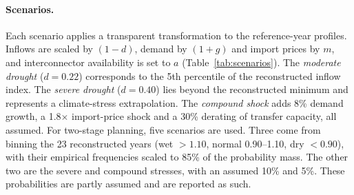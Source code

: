 \paragraph{Scenarios.} Each scenario applies a transparent transformation to the reference-year profiles.
Inflows are scaled by $(1-d)$, demand by $(1+g)$ and import prices by $m$, and interconnector availability
is set to $a$ (Table~\ref{tab:scenarios}). The \emph{moderate drought} ($d=0.22$) corresponds to the 5th
percentile of the reconstructed inflow index. The \emph{severe drought} ($d=0.40$) lies beyond the
reconstructed minimum and represents a climate-stress extrapolation. The \emph{compound shock} adds 8\% demand
growth, a 1.8$\times$ import-price shock and a 30\% derating of transfer capacity, all assumed. For two-stage
planning, five scenarios are used. Three come from binning the 23 reconstructed years (wet $>1.10$, normal
0.90--1.10, dry $<0.90$), with their empirical frequencies scaled to 85\% of the probability mass. The other
two are the severe and compound stresses, with an assumed 10\% and 5\%. These probabilities are partly assumed
and are reported as such.


